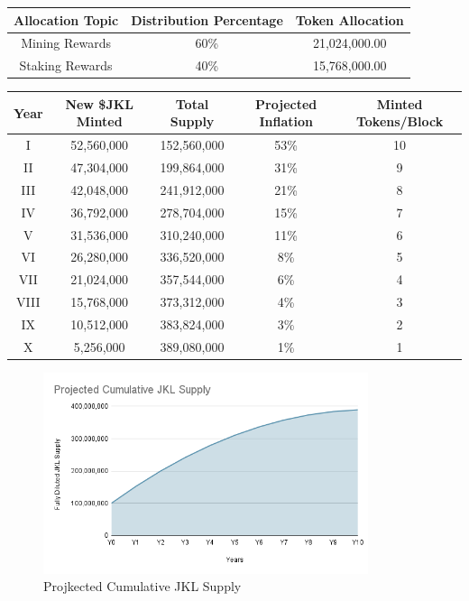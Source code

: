 \documentclass[11pt, nofootinbib]{article}
\begin{document}
\begin{center}
\begin{tabular}{|c c c|} 
 \hline
 Allocation Topic & Distribution Percentage & Token Allocation \\ [0.5ex] 
 \hline\hline
 Mining Rewards & 60\%  & 21,024,000.00 \\ 
 \hline
 Staking Rewards  & 40\% & 15,768,000.00 \\
 \hline
\end{tabular}
\end{center}


\begin{center}
\begin{tabular}{|c c c c c|} 
 \hline
 Year & New \$JKL Minted & Total Supply &   Projected Inflation & Minted Tokens/Block \\ [0.5ex] 
 \hline\hline
 I & 52,560,000 & 152,560,000 & 53\% & 10 \\ 
 \hline
 II & 47,304,000 & 199,864,000 & 31\% & 9 \\
 \hline
 III & 42,048,000 & 241,912,000 & 21\% & 8 \\   
\hline
 IV & 36,792,000 & 278,704,000 & 15\% & 7 \\  
\hline
 V & 31,536,000 & 310,240,000  & 11\% & 6 \\  
\hline
 VI & 26,280,000 & 336,520,000  & 8\% & 5 \\  
\hline
 VII & 21,024,000 & 357,544,000 & 6\% & 4 \\  
\hline
 VIII & 15,768,000 & 373,312,000 & 4\% & 3 \\ 
\hline
 IX & 10,512,000 & 383,824,000 & 3\% & 2 \\ 
\hline
 X & 5,256,000 & 389,080,000 & 1\% & 1 \\
 \hline
\end{tabular}
\end{center}

\begin{center}
\begin{figure}
\centering
\includegraphics[width=0.85\textwidth]{chart1.png}
\caption{Projkected Cumulative JKL Supply}
\end{figure}
\end{center}
\end{document}
